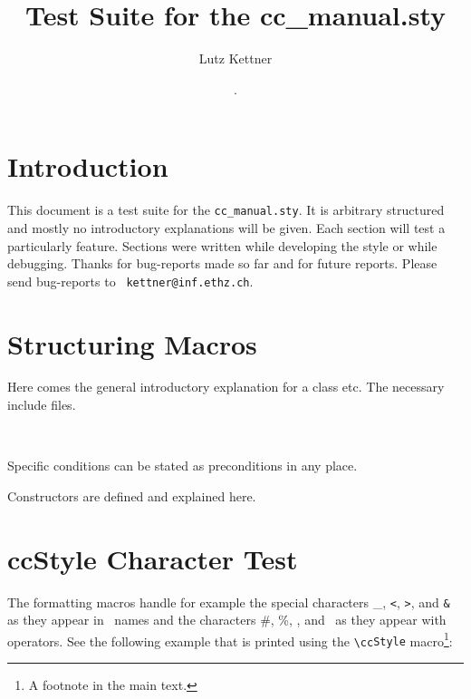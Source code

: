 \documentclass[12pt]{article}
\title {Test Suite for the cc\_manual.sty}
\author{Lutz Kettner}
\date{\ccRevision. \ccDate}
\begin{document}
\maketitle

\section{Introduction}

This document is a test suite for the {\tt cc\_manual.sty}. It is
arbitrary structured and mostly no introductory explanations will be given.
Each section will test a particularly feature. Sections were written
while developing the style or while debugging. Thanks for bug-reports
made so far and for future reports. Please send bug-reports to {\tt
  kettner@inf.ethz.ch}.


\section{Structuring Macros}

\ccDefinition Here comes the general introductory explanation for a
class etc. The necessary include files.

\\

\ccAccessFunctions

\ccPrecond Specific conditions can be stated as preconditions in any place.

\ccCreation Constructors are defined and explained here.

\section{ccStyle Character Test}

The formatting macros handle for example the special characters \_,
{\tt <}, {\tt >}, and {\tt \&} as they appear in \CC\ names and the
characters \#, \%, \ccHat, and \ccTilde\ as they appear with
operators. See the following example that is printed using the
\verb+\cc+{\tt Style} macro\footnote{A footnote in the main text.}:
\end{document}
